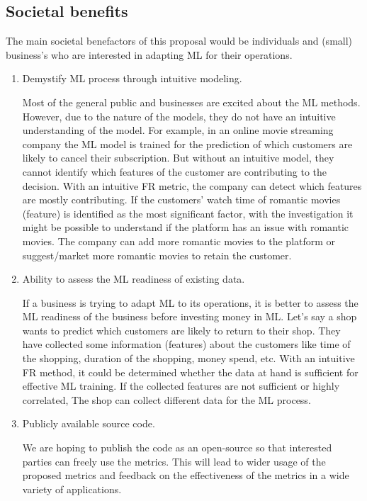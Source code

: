 \documentclass[11pt]{article}
\begin{document}
\subsection{Societal benefits}
The main societal benefactors of this proposal would be individuals and (small) business's who are interested in adapting ML for their operations.
\begin{enumerate}
    \item Demystify ML process through intuitive modeling.
    
    Most of the general public and businesses are excited about the ML methods. However, due to the  nature of the models, they do not have an intuitive understanding of the model. For example, in an online movie streaming company the ML model is trained for the prediction of which customers are likely to cancel their subscription. But without an intuitive model, they cannot identify which features of the customer are contributing to the decision.  With an intuitive FR metric, the company can detect which features are mostly contributing. If the customers' watch time of romantic movies (feature)  is identified as the most significant factor, with the investigation it might be possible to understand if the platform has an issue with romantic movies. The company can add more romantic movies to the platform or suggest/market more romantic movies to retain the customer.
    
    \item Ability to assess the ML readiness of existing data.
    
    If a business is trying to adapt ML to its operations, it is better to assess the ML readiness of the business before investing money in ML. Let's say a shop wants to predict which customers are likely to return to their shop. They have collected some information (features) about the customers like time of the shopping, duration of the shopping, money spend, etc. With an intuitive FR method, it could be determined whether the data at hand is sufficient for effective ML training. If the collected features are not sufficient or highly correlated, The shop can collect different data for the ML process. 
    
    \item Publicly available source code.
    
    We are hoping to publish the code as an open-source so that interested parties can freely use the metrics. This will lead to wider usage of the proposed metrics and feedback on the effectiveness of the metrics in a wide variety of applications.

\end{enumerate}
\newpage



\newpage

\end{document}
